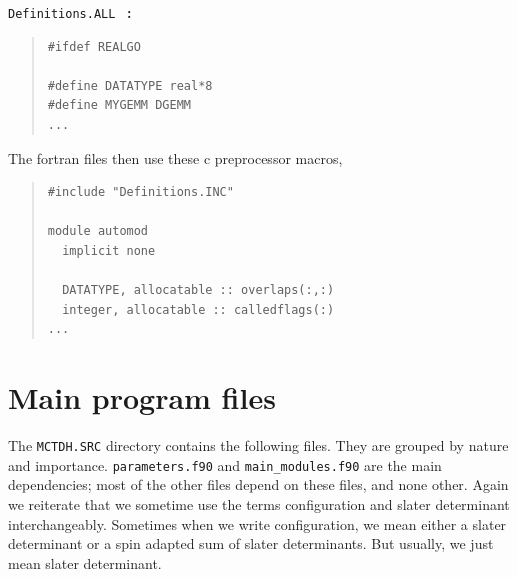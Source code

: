 \documentclass[10pt,leqno, oneside]{book}
\begin{document}
\verb#Definitions.ALL# \ {\bf :}

{\small
\begin{quote}
\begin{verbatim}
#ifdef REALGO

#define DATATYPE real*8
#define MYGEMM DGEMM
...
\end{verbatim}
\end{quote}}
The fortran files then use these c preprocessor macros,
{\small
\begin{quote}
\begin{verbatim}
#include "Definitions.INC"

module automod
  implicit none

  DATATYPE, allocatable :: overlaps(:,:)
  integer, allocatable :: calledflags(:)
...
\end{verbatim}
\end{quote}}

\section{Main program files}

The \verb#MCTDH.SRC# directory contains the following files.  They are grouped by nature and importance.
\verb#parameters.f90# and \verb#main_modules.f90# are the main dependencies; most of the other files depend
on these files, and none other.  Again we reiterate that we sometime use the terms configuration and slater determinant 
interchangeably.  Sometimes when we write configuration, we mean either a slater determinant or a spin adapted sum
of slater determinants.  But usually, we just mean slater determinant.
\end{document}
